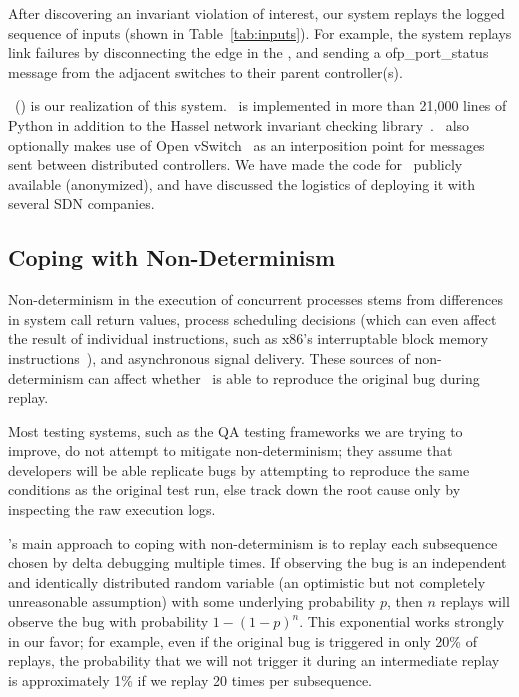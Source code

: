 After discovering an invariant violation of interest, our system replays
the logged sequence of inputs (shown in Table~\ref{tab:inputs}). For example,
the system replays link failures
by disconnecting the edge in the \tester, and sending a
ofp\_port\_status~\cite{openflow} message from the adjacent switches to their parent controller(s).

\projectname~(\projectmeaning) is our realization of this system.
\projectname~is implemented in more than 21,000 lines of Python in
addition to the Hassel network invariant checking library~\cite{hsa}.
\projectname~also optionally makes use of Open vSwitch~\cite{pfaff2009extending} as an interposition point for
messages sent between distributed controllers. We have
made the code
for \projectname~publicly available (anonymized), %
and have discussed the logistics of deploying it with several SDN companies.


\subsection{Coping with Non-Determinism}

Non-determinism in the execution of concurrent processes stems from
differences in system call return values, process scheduling decisions (which can
even affect the result of individual instructions, such as x86's
interruptable block memory instructions~\cite{Dunlap:2002:REI:844128.844148}),
and asynchronous signal
delivery. These sources of non-determinism can affect whether \projectname~is
able to reproduce the original bug during replay.

Most testing systems, such as the QA testing frameworks we are
trying to improve, do not attempt to mitigate non-determinism; they assume
that developers will be able replicate bugs by attempting to reproduce the
same conditions as the original test run, else track down the root cause
only by
inspecting the raw execution logs.

\projectname's main approach to coping with non-determinism
is to replay each subsequence chosen
by delta debugging multiple times. If observing the bug
is an independent and identically distributed random variable (an optimistic
but not completely unreasonable assumption) with some
underlying probability $p$, then $n$
replays will observe the bug with probability $1-(1-p)^{n}$. This exponential
works strongly in our favor; for example, even if the original bug is
triggered in only 20\% of replays, the probability that we will not trigger
it during an intermediate replay is approximately
1\% if we replay 20 times per subsequence.

